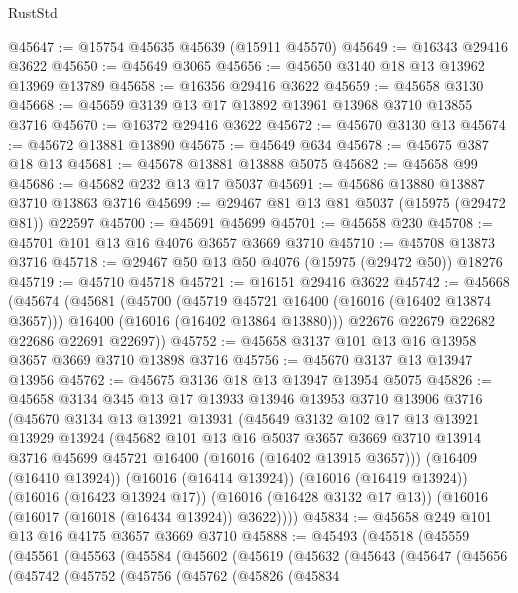 \begin{lexlean}{RustStd}
\begin{coremodule}
@45647 := @15754 @45635 @45639 (@15911 @45570)
@45649 := @16343 @29416 @3622
@45650 := @45649 @3065
@45656 := @45650 @3140 @18 @13 @13962 @13969 @13789
@45658 := @16356 @29416 @3622
@45659 := @45658 @3130
@45668 := @45659 @3139 @13 @17 @13892 @13961 @13968 @3710 @13855 @3716
@45670 := @16372 @29416 @3622
@45672 := @45670 @3130 @13
@45674 := @45672 @13881 @13890
@45675 := @45649 @634
@45678 := @45675 @387 @18 @13
@45681 := @45678 @13881 @13888 @5075
@45682 := @45658 @99
@45686 := @45682 @232 @13 @17 @5037
@45691 := @45686 @13880 @13887 @3710 @13863 @3716
@45699 := @29467 @81 @13 @81 @5037 (@15975 (@29472 @81)) @22597
@45700 := @45691 @45699
@45701 := @45658 @230
@45708 := @45701 @101 @13 @16 @4076 @3657 @3669 @3710
@45710 := @45708 @13873 @3716
@45718 := @29467 @50 @13 @50 @4076 (@15975 (@29472 @50)) @18276
@45719 := @45710 @45718
@45721 := @16151 @29416 @3622
@45742 := @45668
    (@45674
      (@45681
        (@45700
          (@45719 @45721 @16400 (@16016 (@16402 @13874 @3657)))
          @16400
          (@16016 (@16402 @13864 @13880)))
        @22676
        @22679
        @22682
        @22686
        @22691
        @22697))
@45752 := @45658 @3137 @101 @13 @16 @13958 @3657 @3669 @3710 @13898 @3716
@45756 := @45670 @3137 @13 @13947 @13956
@45762 := @45675 @3136 @18 @13 @13947 @13954 @5075
@45826 := @45658
    @3134
    @345
    @13
    @17
    @13933
    @13946
    @13953
    @3710
    @13906
    @3716
    (@45670
      @3134
      @13
      @13921
      @13931
      (@45649
        @3132
        @102
        @17
        @13
        @13921
        @13929
        @13924
        (@45682
          @101
          @13
          @16
          @5037
          @3657
          @3669
          @3710
          @13914
          @3716
          @45699
          @45721
          @16400
          (@16016 (@16402 @13915 @3657)))
        (@16409 (@16410 @13924))
        (@16016 (@16414 @13924))
        (@16016 (@16419 @13924))
        (@16016 (@16423 @13924 @17))
        (@16016 (@16428 @3132 @17 @13))
        (@16016 (@16017 (@16018 (@16434 @13924)) @3622))))
@45834 := @45658 @249 @101 @13 @16 @4175 @3657 @3669 @3710
@45888 := @45493
    (@45518
      (@45559
        (@45561
          (@45563
            (@45584
              (@45602
                (@45619
                  (@45632
                    (@45643
                      (@45647
                        (@45656
                          (@45742
                            (@45752
                              (@45756
                                (@45762
                                  (@45826
                                    (@45834

\end{coremodule}
\end{lexlean}
